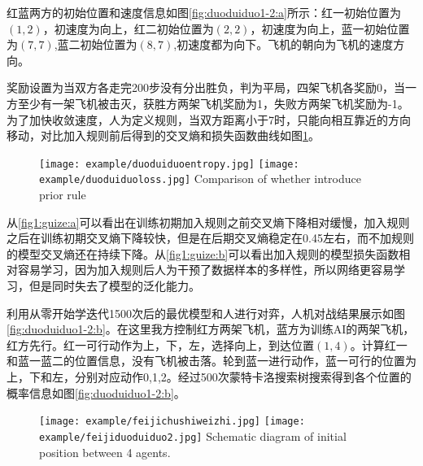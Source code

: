 红蓝两方的初始位置和速度信息如图\ref{fig:duoduiduo1-2:a}所示：红一初始位置为$(1,2)$，初速度为向上，红二初始位置为$(2,2)$，初速度为向上，蓝一初始位置为$(7,7)$,蓝二初始位置为$(8,7)$,初速度都为向下。飞机的朝向为飞机的速度方向。



奖励设置为当双方各走完200步没有分出胜负，判为平局，四架飞机各奖励0，当一方至少有一架飞机被击灭，获胜方两架飞机奖励为1，失败方两架飞机奖励为-1。为了加快收敛速度，人为定义规则，当双方距离小于7时，只能向相互靠近的方向移动，对比加入规则前后得到的交叉熵和损失函数曲线如图\ref{fig1:guize}。
\begin{figure}[hbpt]
	\centering
	{\texttt{[image: example/duoduiduoentropy.jpg]}}
	\hspace{0.5em}
	{\texttt{[image: example/duoduiduoloss.jpg]}}
	{Comparison of whether introduce prior rule}
	\label{fig1:guize}
\end{figure}

从\ref{fig1:guize:a}可以看出在训练初期加入规则之前交叉熵下降相对缓慢，加入规则之后在训练初期交叉熵下降较快，但是在后期交叉熵稳定在0.45左右，而不加规则的模型交叉熵还在持续下降。从\ref{fig1:guize:b}可以看出加入规则的模型损失函数相对容易学习，因为加入规则后人为干预了数据样本的多样性，所以网络更容易学习，但是同时失去了模型的泛化能力。

利用从零开始学迭代1500次后的最优模型和人进行对弈，人机对战结果展示如图\ref{fig:duoduiduo1-2:b}。在这里我方控制红方两架飞机，蓝方为训练AI的两架飞机，红方先行。红一可行动作为上，下，左，选择向上，到达位置$(1,4)$。计算红一和蓝一蓝二的位置信息，没有飞机被击落。轮到蓝一进行动作，蓝一可行的位置为上，下和左，分别对应动作0,1,2。经过500次蒙特卡洛搜索树搜索得到各个位置的概率信息如图\ref{fig:duoduiduo1-2:b}。

\begin{figure}[!htbp]
	\centering
	\subcaptionbox{\label{fig:duoduiduo1-2:a}}
	{\texttt{[image: example/feijichushiweizhi.jpg]}}
	\hspace{0.5em}
	\subcaptionbox{\label{fig:duoduiduo1-2:b}}
	{\texttt{[image: example/feijiduoduiduo2.jpg]}}
	{Schematic diagram of initial position between 4 agents.}
	\label{fig:duoduiduo1-2}
\end{figure}

